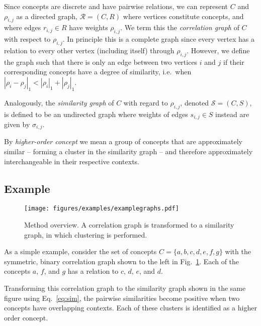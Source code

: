 \documentclass{sig-alternate}
\newcommand{\comment}[1]{{\small \color{red} {#1}} \normalcolor}
\newcommand{\rn}[1]{\rho_{#1}}
\newcommand{\rns}[1]{|\rn{#1}|_1}
\newcommand{\sy}[1]{\sigma_{#1}}
\newcommand{\dnm}[2]{|\rn{#1}-\rn{#2}|_1}
\begin{document}
Since concepts are discrete and have pairwise relations, we can represent $C$ and $\rn{i,j}$ as a directed graph,
$\mathcal{R} = (C, R)$ where vertices constitute concepts, and where edges $r_{i,j} \in R$ have weights $\rn{i,j}$. We
term this the \emph{correlation graph} of $C$ with respect to $\rn{i,j}$. In principle this is a complete graph since
every vertex has a relation to every other vertex (including itself) through $\rn{i,j}$. However, we define the graph
such that there is only an edge between two vertices $i$ and $j$ if their corresponding concepts have a degree of
similarity, i.e.\ when $\dnm{i}{j} < \rns{i} + \rns{j}$.

Analogously, the \emph{similarity graph} of $C$ with regard to $\rn{i,j}$, denoted $\mathcal{S} = (C, S)$, is defined
to be an undirected graph where weights of edges $s_{i,j} \in S$ instead are given by $\sy{i,j}$. %

By \emph{higher-order concept} we mean a group of concepts that are approximately similar -- forming a cluster in the similarity graph -- and therefore approximately interchangeable in their respective contexts.

\subsection{Example}

\begin{figure}
\begin{center}
\texttt{[image: figures/examples/examplegraphs.pdf]}
\end{center}
\caption{Method overview. A correlation graph is transformed to a similarity graph, in which clustering is performed.}
\label{fig:examplegraphs}
\end{figure}

\begin{sloppypar}
As a simple example, consider the set of concepts $C = \{a,b,c,d,e,f,g\}$ with the symmetric, binary correlation graph shown to the left in Fig.\ \ref{fig:examplegraphs}. Each of the concepts $a$, $f$, and $g$ has a relation to $c$, $d$, $e$, and $d$.
\end{sloppypar}

Transforming this correlation graph to the similarity graph shown in the same figure using Eq.\ \ref{eq:sim}, the pairwise similarities become positive when two concepts have overlapping contexts. Each of these clusters is  identified as a higher order concept.
\end{document}
